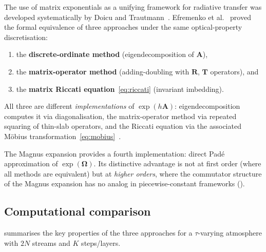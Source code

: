 \documentclass[11pt,a4paper]{article}
\newcommand{\mat}[1]{\mathbf{#1}}
\theoremstyle{definition}
\begin{document}
The use of matrix exponentials as a unifying framework for radiative
transfer was developed systematically by Doicu and
Trautmann~\cite{doicu2009}.  Efremenko et
al.~\cite{efremenko2017} proved the formal equivalence of three
approaches under the same optical-property discretisation:
\begin{enumerate}[nosep]
\item the \textbf{discrete-ordinate method} (eigendecomposition of
  $\mat{A}$),
\item the \textbf{matrix-operator method} (adding-doubling with
  $\mat{R}$, $\mat{T}$ operators), and
\item the \textbf{matrix Riccati equation}~\eqref{eq:riccati}
  (invariant imbedding).
\end{enumerate}
All three are different \emph{implementations} of $\exp(h\mat{A})$:
eigendecomposition computes it via diagonalisation, the matrix-operator
method via repeated squaring of thin-slab operators, and the Riccati
equation via the associated M\"obius
transformation~\eqref{eq:mobius}~\cite{efremenko2017}.

The Magnus expansion provides a fourth implementation: direct
Pad\'e approximation of $\exp(\mat{\Omega})$.  Its distinctive
advantage is not at first order (where all methods are equivalent) but
at \emph{higher orders}, where the commutator structure of the Magnus
expansion has no analog in piecewise-constant frameworks
().

\subsection{Computational comparison}\label{sec:comp_cost}

 summarises the key properties of the three
approaches for a $\tau$-varying atmosphere with $2N$ streams and $K$
steps/layers.
\end{document}
